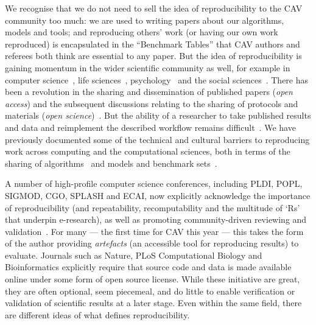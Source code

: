 \documentclass{llncs}
\begin{document}
We recognise that we do not need to sell the idea of reproducibility
to the CAV community too much: we are used to writing papers about our
algorithms, models and tools; and reproducing others' work (or having
our own work reproduced) is encapsulated in the ``Benchmark Tables''
that CAV authors and referees both think are essential to any
paper. But the idea of reproducibility is gaining momentum in the
wider scientific community as well, for example in computer
science~\cite{collberg-et-al:2014}, life
sciences~\cite{rollins-et-al:2014},
psychology~\cite{chambers-et-al:2014} and the social
sciences~\cite{conte-et-al:2012}.  There has been a revolution in the
sharing and dissemination of published papers (\emph{open access}) and
the subsequent discussions relating to the sharing of protocols and
materials (\emph{open science})~\cite{rssaaoe:2012}. But the ability
of a researcher to take published results and data and reimplement the
described workflow remains
difficult~\cite{peng:2011,sandve-et-al:2013,wilson-et-al:2014}.  We
have previously documented some of the technical and cultural barriers
to reproducing work across computing and the computational sciences,
both in terms of the sharing of
algorithms~\cite{crick-et-al_wssspe2} and models and benchmark
sets~\cite{crick-et-al_recomp2014,crick+chuehong:2014}.


A number of high-profile computer science conferences, including PLDI,
POPL, SIGMOD, CGO, SPLASH and ECAI, now explicitly acknowledge the
importance of reproducibility (and repeatability, recomputability and
the multitude of `Rs' that underpin e-research), as well as promoting
community-driven reviewing and validation~\cite{fursin+dubach:2014}.
For many --- the first time for CAV this year --- this takes the form
of the author providing \emph{artefacts} (an accessible tool for
reproducing results) to evaluate. Journals such as Nature, PLoS
Computational Biology and Bioinformatics explicitly require that
source code and data is made available online under some form of open
source license. While these initiative are great, they are often
optional, seem piecemeal, and do little to enable verification or
validation of scientific results at a later stage. Even within the
same field, there are different ideas of what defines reproducibility.
\end{document}
